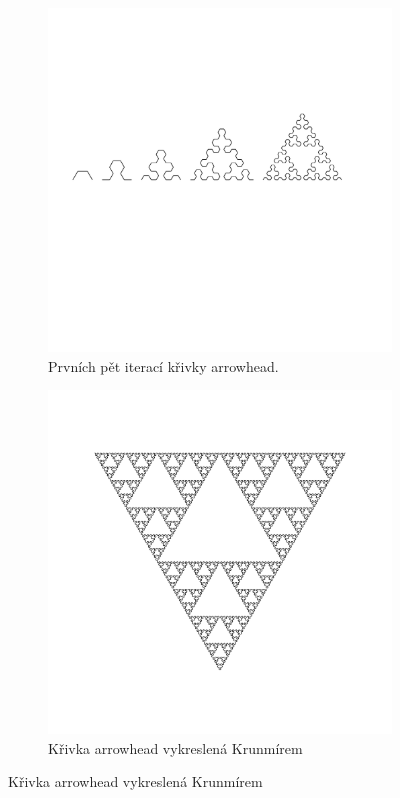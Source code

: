 \begin{figure}
  \centering
  \caption{Křivka arrowhead}
  \label{fig:krunimir-arrowhead-all}

  \begin{subfigure}{0.8\textwidth}
    \includegraphics[width=\textwidth,trim=0 250 50 200]
      {krunimir/examples/arrowhead-gen}
    \caption{Prvních pět iterací křivky arrowhead.}
    \label{fig:krunimir-arrowhead-gen}
  \end{subfigure}

  \begin{subfigure}{0.9\textwidth}
    \includegraphics[width=\textwidth]{krunimir/examples/arrowhead}
    \caption{Křivka arrowhead vykreslená Krunmírem}
    \label{fig:krunimir-arrowhead}
  \end{subfigure}
\end{figure}

